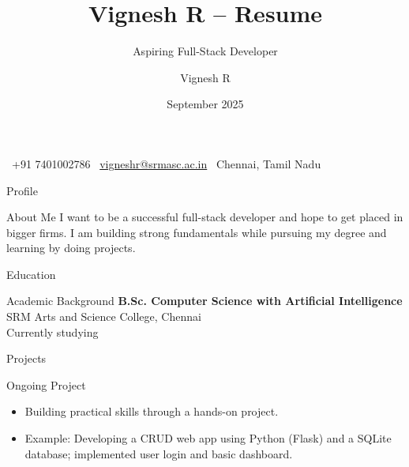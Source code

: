 \documentclass[10pt]{beamer}
\title{Vignesh R -- Resume}
\subtitle{Aspiring Full-Stack Developer}
\author{Vignesh R}
\date{September 2025}
\begin{document}
\begin{frame}
    \titlepage
    \centering
    \vspace{0.5cm}
    {\small
    \faPhone\ +91 7401002786 \hfill
    \faEnvelope\ \href{mailto:vigneshr@srmasc.ac.in}{vigneshr@srmasc.ac.in} \hfill
    \faMapMarker\ Chennai, Tamil Nadu
    }
\end{frame}

\begin{frame}{Profile}
    \begin{block}{About Me}
        I want to be a successful full-stack developer and hope to get placed in bigger firms. I am building strong fundamentals while pursuing my degree and learning by doing projects.
    \end{block}
\end{frame}

\begin{frame}{Education}
    \begin{block}{Academic Background}
        \textbf{B.Sc. Computer Science with Artificial Intelligence} \\
        SRM Arts and Science College, Chennai \\
        Currently studying
    \end{block}
\end{frame}

\begin{frame}{Projects}
    \begin{block}{Ongoing Project}
        \begin{itemize}
            \item Building practical skills through a hands-on project.
            \item Example: Developing a CRUD web app using Python (Flask) and a SQLite database; implemented user login and basic dashboard.
        \end{itemize}
    \end{block}
\end{frame}
\end{document}
